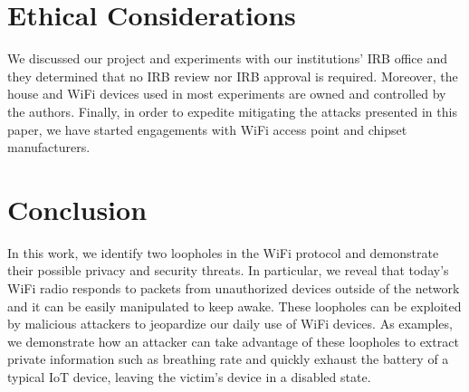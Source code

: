 \section{Ethical Considerations}
We discussed our project and experiments with our institutions’ IRB office and they determined that no IRB review nor IRB approval is required. Moreover, the house and WiFi devices used in most experiments are owned and controlled by the authors. Finally, in order to expedite mitigating the attacks presented in this paper, we have started engagements with WiFi access point and chipset manufacturers. 

\section{Conclusion}
In this work, we identify two loopholes in the WiFi protocol and demonstrate their possible privacy and security threats. In particular, we reveal that today's WiFi radio responds to packets from unauthorized devices outside of the network and it can be easily manipulated to keep awake. These loopholes can be exploited by malicious attackers to jeopardize our daily use of WiFi devices. As examples, we demonstrate how an attacker can take advantage of these loopholes to extract private information such as breathing rate and quickly exhaust the battery of a typical IoT device, leaving the victim's device in a disabled state. 